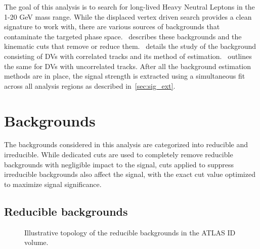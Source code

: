 The goal of this analysis is to search for long-lived Heavy Neutral Leptons in the 1-20 GeV mass range. While the displaced vertex driven search provides a clean signature to work with, there are various sources of backgrounds that contaminate the targeted phase space.~ describes these backgrounds and the kinematic cuts that remove or reduce them.~ details the study of the background consisting of DVs with correlated tracks and its method of estimation.~ outlines the same for DVs with uncorrelated tracks. After all the background estimation methods are in place, the signal strength is extracted using a simultaneous fit across all analysis regions as described in~\cref{sec:sig_ext}.

\section{Backgrounds}\label{sec:backgrounds}
The backgrounds considered in this analysis are categorized into reducible and irreducible. While dedicated cuts are used to completely remove reducible backgrounds with negligible impact to the signal, cuts applied to suppress irreducible backgrounds also affect the signal, with the exact cut value optimized to maximize signal significance.

\subsection{Reducible backgrounds}
\begin{figure}[!ht]
    \centering
     \caption{Illustrative topology of the reducible backgrounds in the ATLAS ID volume.}
     \label{fig:bkg_reducible}
\end{figure}

